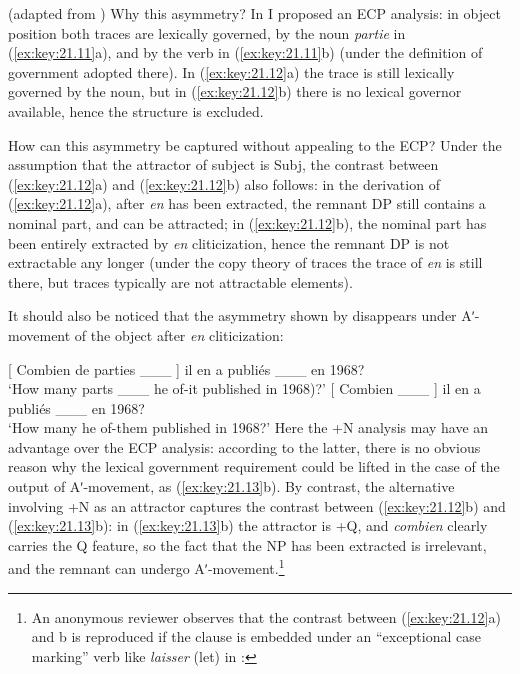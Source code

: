 \documentclass[output=paper]{langsci/langscibook}
\begin{document}
\begin{exe}
\ea%
    \label{ex:key:21.12} (adapted from \citealt{Ruwet1972})
    \z
\z
%
Why this asymmetry? In \citet[37--38]{Rizzi1990} I proposed an \gls{ECP}
analysis: in object position both traces are lexically governed, by the noun
\emph{partie} in (\ref{ex:key:21.11}a), and by the verb in (\ref{ex:key:21.11}b)
(under the definition of government adopted there). In (\ref{ex:key:21.12}a) the
trace is still lexically governed by the noun, but in (\ref{ex:key:21.12}b) there
is no lexical governor available, hence the structure is excluded.

How can this asymmetry be captured without appealing to the ECP? Under the
assumption that the attractor of subject is Subj\tss{[+N]}, the contrast
between (\ref{ex:key:21.12}a) and (\ref{ex:key:21.12}b) also follows: in the
derivation of (\ref{ex:key:21.12}a), after \emph{en} has been extracted, the
remnant DP still contains a nominal part, and can be attracted; in
(\ref{ex:key:21.12}b), the nominal part has been entirely extracted by
\emph{en} cliticization, hence the remnant DP is not extractable any longer
(under the copy theory of traces the trace of \emph{en} is still there, but
traces typically are not attractable elements).

It should also be noticed that the asymmetry shown by 
disappears under Aʹ-movement of the object after \emph{en} cliticization:

\ea%
    \label{ex:key:21.13}
    \ea {}[ Combien de parties \_\_\_ ] il en a publiés \_\_\_ en 1968?\\
        ‘How many parts \_\_\_  he of-it published in 1968)?’
    \ex {}[ Combien \_\_\_ ]  il en a publiés \_\_\_ en 1968?\\
            ‘How many        he of-them published in 1968?’
    \z
\z\largerpage[-5]
%
Here the +N analysis may have an advantage over the \gls{ECP} analysis:
according to the latter, there is no obvious reason why the lexical government
requirement could be lifted in the case of the output of Aʹ-movement, as
(\ref{ex:key:21.13}b). By contrast, the alternative involving +N as an attractor
captures the contrast between (\ref{ex:key:21.12}b) and (\ref{ex:key:21.13}b): in
(\ref{ex:key:21.13}b) the attractor is +Q, and \emph{combien} clearly carries the
Q feature, so the fact that the NP has been extracted is irrelevant, and the
remnant can undergo Aʹ-movement.\footnote{An anonymous reviewer observes that
the contrast between (\ref{ex:key:21.12}a) and b is reproduced if the clause is
embedded under an “exceptional case marking” verb like \emph{laisser} (let) in
:

}
\end{exe}
\end{document}
